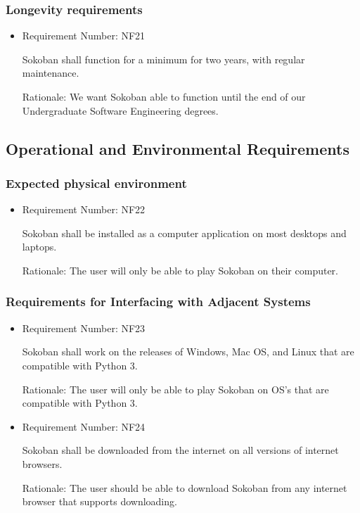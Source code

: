 \documentclass[12pt, titlepage]{article}
\begin{document}
\subsubsection{Longevity requirements}

\begin{itemize}
    \item Requirement Number: NF21
    
Sokoban shall function for a minimum for two years, with regular maintenance.
     
    Rationale: We want Sokoban able to function until the end of our Undergraduate Software Engineering degrees.
\end{itemize}

\subsection{Operational and Environmental Requirements}
\subsubsection{Expected physical environment}

\begin{itemize}
    \item Requirement Number: NF22
    
Sokoban shall be installed as a computer application on most desktops and laptops.
     
    Rationale: The user will only be able to play Sokoban on their computer.
\end{itemize}

\subsubsection{Requirements for Interfacing with Adjacent Systems}

\begin{itemize}
    \item Requirement Number: NF23
    
Sokoban shall work on the releases of Windows, Mac OS, and Linux that are compatible with Python 3.
     
    Rationale: The user will only be able to play Sokoban on OS's that are compatible with Python 3.
    
    \item Requirement Number: NF24
    
 Sokoban shall be downloaded from the internet on all versions of internet browsers.
     
    Rationale: The user should be able to download Sokoban from any internet browser that supports downloading.
\end{itemize}
\end{document}
